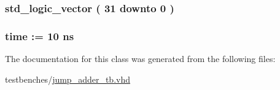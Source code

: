 \hypertarget{classjump__adder__tb_1_1behavior_afb052939be0f788cfe696c87ec9a06d9}{
\subsubsection[{jmp\-\_\-adress}]{ {\bfseries std\-\_\-logic\-\_\-vector (   31    downto    0  ) } }}\label{classjump__adder__tb_1_1behavior_afb052939be0f788cfe696c87ec9a06d9}
\hypertarget{classjump__adder__tb_1_1behavior_a3ffd56257467a8089d6f08ff6c8d0755}{
\subsubsection[{clk\-\_\-period}]{ {\bfseries time  \-:=  10  ns } }}\label{classjump__adder__tb_1_1behavior_a3ffd56257467a8089d6f08ff6c8d0755}


\-The documentation for this class was generated from the following files\-:\begin{DoxyCompactItemize}
\item 
testbenches/\hyperlink{jump__adder__tb_8vhd}{jump\-\_\-adder\-\_\-tb.\-vhd}\end{DoxyCompactItemize}

